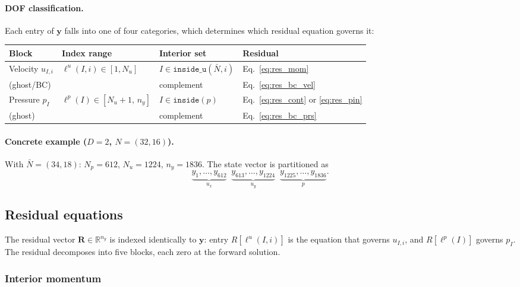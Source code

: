 \documentclass[11pt]{article}
\newcommand{\vect}[1]{\bm{#1}}
\begin{document}
\paragraph{DOF classification.}
Each entry of $\vect{y}$ falls into one of four categories, which
determines which residual equation governs it:

\begin{center}
\renewcommand{\arraystretch}{1.3}
\begin{tabular}{llll}
  \hline
  \textbf{Block} & \textbf{Index range} & \textbf{Interior set}
    & \textbf{Residual} \\
  \hline
  Velocity $u_{I,i}$
    & $\ell^{u}(I,i)\in[1,N_u]$
    & $I\in\texttt{inside\_u}(\bar N,i)$
    & Eq.~\eqref{eq:res_mom} \\
  \quad (ghost/BC)
    &
    & complement
    & Eq.~\eqref{eq:res_bc_vel} \\
  Pressure $p_I$
    & $\ell^{p}(I)\in[N_u{+}1,\,n_y]$
    & $I\in\texttt{inside}(p)$
    & Eq.~\eqref{eq:res_cont} or \eqref{eq:res_pin} \\
  \quad (ghost)
    &
    & complement
    & Eq.~\eqref{eq:res_bc_prs} \\
  \hline
\end{tabular}
\end{center}

\paragraph{Concrete example ($D=2$, $N=(32,16)$).}
With $\bar N = (34, 18)$: $N_p = 612$, $N_u = 1224$, $n_y = 1836$.
The state vector is partitioned as
\[
  \underbrace{y_1,\ldots,y_{612}}_{u_{x}}
  \;\;
  \underbrace{y_{613},\ldots,y_{1224}}_{u_{y}}
  \;\;
  \underbrace{y_{1225},\ldots,y_{1836}}_{p}.
\]

\subsection{Residual equations}

The residual vector $\vect{R}\in\mathbb{R}^{n_y}$ is indexed identically
to $\vect{y}$: entry $R[\ell^{u}(I,i)]$ is the equation that governs
$u_{I,i}$, and $R[\ell^{p}(I)]$ governs $p_I$.  The residual decomposes
into five blocks, each zero at the forward solution.

\subsubsection{Interior momentum}
\end{document}
